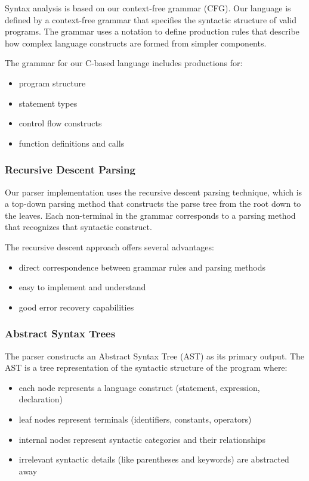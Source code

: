 \documentclass[12pt, letterpaper]{article}
\begin{document}
Syntax analysis is based on our context-free grammar (CFG). Our language is defined by a context-free grammar that specifies the syntactic structure of valid programs. The grammar uses a notation to define production rules that describe how complex language constructs are formed from simpler components.

The grammar for our C-based language includes productions for:

\begin{itemize}
    \item program structure
    \item statement types
    \item control flow constructs
    \item function definitions and calls
\end{itemize}

\subsubsection*{Recursive Descent Parsing}

Our parser implementation uses the recursive descent parsing technique, which is a top-down parsing method that constructs the parse tree from the root down to the leaves. Each non-terminal in the grammar corresponds to a parsing method that recognizes that syntactic construct.

The recursive descent approach offers several advantages:

\begin{itemize}
    \item direct correspondence between grammar rules and parsing methods
    \item easy to implement and understand
    \item good error recovery capabilities
\end{itemize}

\subsubsection*{Abstract Syntax Trees}

The parser constructs an Abstract Syntax Tree (AST) as its primary output. The AST is a tree representation of the syntactic structure of the program where:

\begin{itemize}
    \item each node represents a language construct (statement, expression, declaration)
    \item leaf nodes represent terminals (identifiers, constants, operators)
    \item internal nodes represent syntactic categories and their relationships
    \item irrelevant syntactic details (like parentheses and keywords) are abstracted away
\end{itemize}
\end{document}
